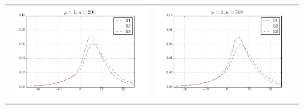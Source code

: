 \begin{table}[!ht]
{\begin{tabular}{c c}
\includegraphics[width=8cm]{beta1_scaled_density_200_1} & \includegraphics[width=8cm]{beta1_scaled_density_500_1} \\
\end{tabular}
}
\end{table}

